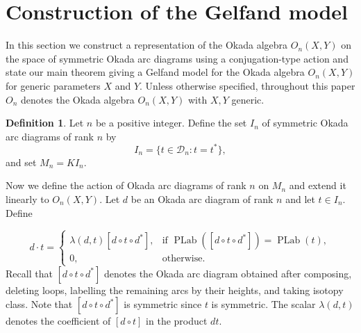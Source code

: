 \documentclass[12pt,reqno]{amsart}
\numberwithin{equation}{section}
\theoremstyle{definition}
\newtheorem{definition}[theorem]{Definition}
\theoremstyle{definition}
\newcommand{\PLab}{\operatorname{PLab}}
\begin{document}
\section{Construction of the Gelfand model}
In this section we construct a representation of the Okada algebra $O_n(X,Y)$ on the space of symmetric Okada arc diagrams using a conjugation-type action and state our main theorem giving a Gelfand model for the Okada algebra $O_n(X,Y)$ for generic parameters $X$ and $Y$. Unless otherwise specified, throughout this paper $O_n$ denotes the Okada algebra $O_n(X,Y)$ with $X,Y$ generic. 
\begin{definition}
Let $n$ be a positive integer. Define the set $I_n$ of symmetric Okada arc
diagrams of rank $n$ by
\[
I_n=\{t\in\mathcal{D}_n : t=t^*\},
\]
and set $M_n=KI_n$.
\end{definition}
Now we define the action of Okada arc diagrams of rank $n$ on $M_n$ and extend it linearly to $O_n(X,Y)$. Let $d$ be an Okada arc diagram of rank $n$ and let $t\in I_n$. Define


\begin{equation}\label{action}
 d\cdot t=
\begin{cases}
\displaystyle \lambda(d,t)[d\circ t\circ d^*],
& \text{if } \PLab([d\circ t\circ d^*])=\PLab(t),\\[6pt]
0,
& \text{otherwise}.
\end{cases}
\end{equation}
Recall that $[d\circ t\circ d^*]$ denotes the Okada arc diagram obtained after composing, deleting loops, labelling the remaining arcs by their heights, and taking isotopy class. Note that $[d \circ t \circ d^*]$ is symmetric since $t$ is symmetric. The scalar $\lambda(d,t)$ denotes the coefficient of $[d \circ t ]$ in the product $dt$.
 
\end{document}
